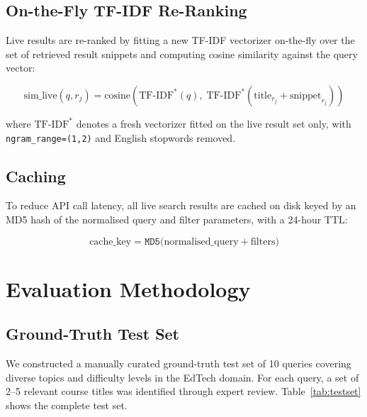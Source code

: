 \documentclass[12pt, a4paper]{article}
\begin{document}
\subsection{On-the-Fly TF-IDF Re-Ranking}

Live results are re-ranked by fitting a new TF-IDF vectorizer on-the-fly over the set of
retrieved result snippets and computing cosine similarity against the query vector:

\begin{equation}
    \text{sim\_live}(q, r_j) = \text{cosine}\!\left(
        \text{TF-IDF}^{*}(q),\;
        \text{TF-IDF}^{*}(\text{title}_{r_j} + \text{snippet}_{r_j})
    \right)
    \label{eq:liverank}
\end{equation}

where $\text{TF-IDF}^{*}$ denotes a fresh vectorizer fitted on the live result set only, with
\texttt{ngram\_range=(1,2)} and English stopwords removed.

\subsection{Caching}

To reduce API call latency, all live search results are cached on disk keyed by an MD5 hash of
the normalised query and filter parameters, with a 24-hour TTL:

\begin{equation}
    \text{cache\_key} = \texttt{MD5}\bigl(\text{normalised\_query} + \text{filters}\bigr)
    \label{eq:cachekey}
\end{equation}

\section{Evaluation Methodology}
\label{sec:evaluation}

\subsection{Ground-Truth Test Set}

We constructed a manually curated ground-truth test set of 10 queries covering diverse
topics and difficulty levels in the EdTech domain. For each query, a set of 2–5 relevant
course titles was identified through expert review. Table~\ref{tab:testset} shows the
complete test set.
\end{document}
